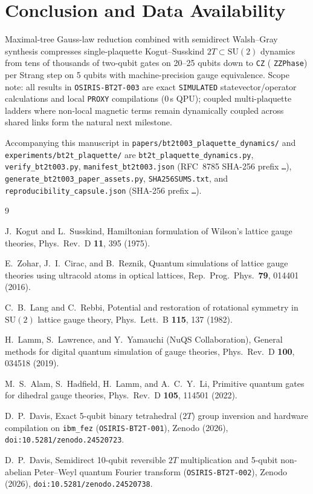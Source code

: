 \documentclass[twocolumn,aps,prapplied,superscriptaddress,floatfix]{revtex4-2}
\begin{document}
\section{Conclusion and Data Availability}\label{sec:data}

Maximal-tree Gauss-law reduction combined with semidirect Walsh--Gray synthesis compresses single-plaquette Kogut--Susskind $2T \subset \mathrm{SU}(2)$ dynamics from tens of thousands of two-qubit gates on 20--25 qubits down to \BtpCzStrangAa{} \texttt{CZ} (\BtpZzStrangHtwo{} \texttt{ZZPhase}) per Strang step on 5 qubits with machine-precision gauge equivalence. Scope note: all results in \texttt{OSIRIS-BT2T-003} are exact \texttt{SIMULATED} statevector/operator calculations and local \texttt{PROXY} compilations (0\,s QPU); coupled multi-plaquette ladders where non-local magnetic terms remain dynamically coupled across shared links form the natural next milestone.

Accompanying this manuscript in \texttt{papers/bt2t003\_plaquette\_dynamics/} and \texttt{experiments/bt2t\_plaquette/} are \texttt{bt2t\_plaquette\_dynamics.py}, \texttt{verify\_bt2t003.py}, \texttt{manifest\_bt2t003.json} (RFC~8785 SHA-256 prefix \texttt{\BtpManifestShaPrefix\ldots}), \texttt{generate\_bt2t003\_paper\_assets.py}, \texttt{SHA256SUMS.txt}, and \texttt{reproducibility\_capsule.json} (SHA-256 prefix \texttt{\BtpCapsuleShaPrefix\ldots}).

\begin{thebibliography}{9}

J.~Kogut and L.~Susskind, Hamiltonian formulation of Wilson's lattice gauge theories, Phys.\ Rev.\ D \textbf{11}, 395 (1975).

E.~Zohar, J.~I.~Cirac, and B.~Reznik, Quantum simulations of lattice gauge theories using ultracold atoms in optical lattices, Rep.\ Prog.\ Phys.\ \textbf{79}, 014401 (2016).

C.~B.~Lang and C.~Rebbi, Potential and restoration of rotational symmetry in $\mathrm{SU}(2)$ lattice gauge theory, Phys.\ Lett.\ B \textbf{115}, 137 (1982).

H.~Lamm, S.~Lawrence, and Y.~Yamauchi (NuQS Collaboration), General methods for digital quantum simulation of gauge theories, Phys.\ Rev.\ D \textbf{100}, 034518 (2019).

M.~S.~Alam, S.~Hadfield, H.~Lamm, and A.~C.~Y.~Li, Primitive quantum gates for dihedral gauge theories, Phys.\ Rev.\ D \textbf{105}, 114501 (2022).

D.~P.~Davis, Exact 5-qubit binary tetrahedral ($2T$) group inversion and hardware compilation on \texttt{ibm\_fez} (\texttt{OSIRIS-BT2T-001}), Zenodo (2026), \texttt{doi:10.5281/zenodo.24520723}.

D.~P.~Davis, Semidirect 10-qubit reversible $2T$ multiplication and 5-qubit non-abelian Peter--Weyl quantum Fourier transform (\texttt{OSIRIS-BT2T-002}), Zenodo (2026), \texttt{doi:10.5281/zenodo.24520738}.

\end{thebibliography}
\end{document}

